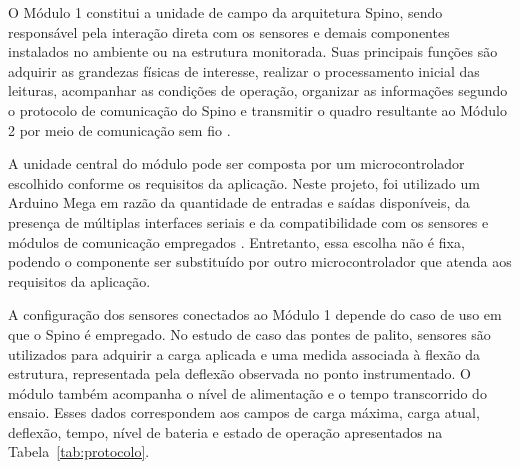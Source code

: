 \documentclass[conference]{IEEEtran}
\begin{document}
O Módulo 1 constitui a unidade de campo da arquitetura Spino,
sendo responsável pela interação direta com os sensores e demais
componentes instalados no ambiente ou na estrutura monitorada.
Suas principais funções são adquirir as grandezas físicas de
interesse, realizar o processamento inicial das leituras,
acompanhar as condições de operação, organizar as informações
segundo o protocolo de comunicação do Spino e transmitir o quadro
resultante ao Módulo 2 por meio de comunicação sem fio
\cite{ouldzira2019,vidalpardo2018,njoku2025}.

A unidade central do módulo pode ser composta por um
microcontrolador escolhido conforme os requisitos da aplicação.
Neste projeto, foi utilizado um Arduino Mega em razão da
quantidade de entradas e saídas disponíveis, da presença de
múltiplas interfaces seriais e da compatibilidade com os sensores
e módulos de comunicação empregados
\cite{vidalpardo2018,njoku2025,elabd2017,arduinodocs}.
Entretanto, essa escolha não é fixa, podendo o componente ser
substituído por outro microcontrolador que atenda aos requisitos
da aplicação.

A configuração dos sensores conectados ao Módulo 1 depende do
caso de uso em que o Spino é empregado. No estudo de caso das
pontes de palito, sensores são utilizados para adquirir a carga
aplicada e uma medida associada à flexão da estrutura,
representada pela deflexão observada no ponto instrumentado. O
módulo também acompanha o nível de alimentação e o tempo
transcorrido do ensaio. Esses dados correspondem aos campos de
carga máxima, carga atual, deflexão, tempo, nível de bateria e
estado de operação apresentados na
Tabela~\ref{tab:protocolo}.
\end{document}
